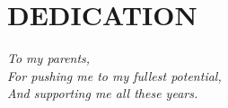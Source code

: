 \chapter*{DEDICATION}\thispagestyle{headings}
\begin{flushright}
  \itshape
  To my parents,\\
  For pushing me to my fullest potential,\\
  And supporting me all these years.
\end{flushright}
